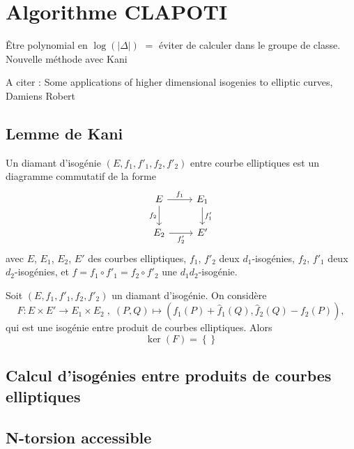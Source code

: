 \section{Algorithme CLAPOTI}

Être polynomial en $\log(|\Delta|)$ $=$ éviter de calculer dans le groupe de classe. Nouvelle méthode avec Kani

A citer : Some applications of higher dimensional isogenies to elliptic curves, Damiens Robert

\subsection{Lemme de Kani}

\begin{Def}
	Un diamant d'isogénie $\left( E,f_{1}, f'_{1}, f_2, f'_2 \right)$  entre courbe elliptiques est un diagramme commutatif de la forme 
	\[\begin{tikzcd}
		E & {E_1} \\
		{E_2} & {E'}
		\arrow["{f_1}", from=1-1, to=1-2]
		\arrow["{f_2}"', from=1-1, to=2-1]
		\arrow["{f'_1}", from=1-2, to=2-2]
		\arrow["{f'_2}"', from=2-1, to=2-2]
	\end{tikzcd}\]
	avec $E$, $E_1$, $E_2$, $E'$ des courbes elliptiques, $f_1$, $f'_2$ deux $d_1$-isogénies, $f_2$, $f'_1$ deux $d_2$-isogénies, et $f = f_1\circ f'_1 = f_2\circ f'_2$ une $d_1d_2$-isogénie. 
\end{Def}

\begin{Prop}
	Soit $\left( E,f_{1}, f'_{1}, f_2, f'_2 \right)$ un diamant d'isogénie. On considère
	\begin{equation*}
		F : E\times E' \rightarrow E_1\times E_2\;,\;(P,Q)\mapsto \left( f_1(P) + \hat{f}_1(Q), \hat{f}_2(Q) - f_2(P) \right), 
	\end{equation*}
	qui est une isogénie entre produit de courbes elliptiques. Alors
	\begin{equation*}
		\ker(F) = \left\lbrace  \right\rbrace 
	\end{equation*}
\end{Prop}




\subsection{Calcul d'isogénies entre produits de courbes elliptiques}

\subsection{N-torsion accessible}

